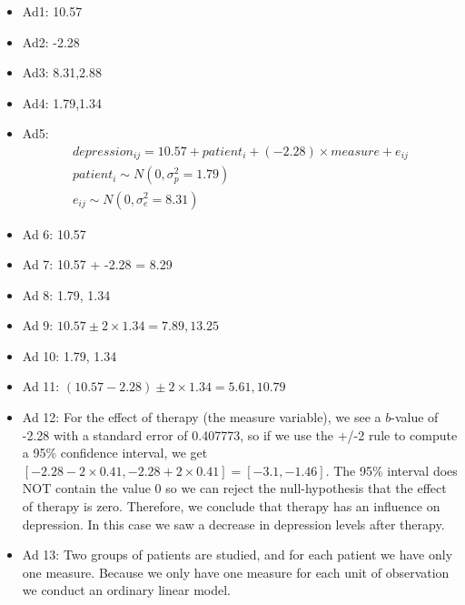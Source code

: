 \documentclass[]{report}\usepackage[]{graphicx}\usepackage[]{color}
\begin{document}
\begin{itemize}

\item Ad1: 10.57 \\
\item Ad2: -2.28 \\
\item Ad3: 8.31,2.88 \\
\item Ad4: 1.79,1.34 \\

\item Ad5:
\begin{eqnarray}
depression_{ij} = 10.57 + patient_i + (-2.28) \times measure + e_{ij} \\
patient_i \sim N(0, \sigma_p^2 = 1.79)\\
e_{ij} \sim N(0, \sigma_e^2 = 8.31)
\end{eqnarray}




\item Ad 6: 10.57\\
\item Ad 7: 10.57 + -2.28  = 8.29\\
\item Ad 8: 1.79, 1.34 \\

\item Ad 9: $10.57 \pm 2 \times 1.34 = {7.89, 13.25}$\\

\item Ad 10: 1.79, 1.34 \\

\item Ad 11: $(10.57 -2.28)  \pm  2 \times 1.34 = {5.61, 10.79 }   $\\

\item Ad 12: For the effect of therapy (the measure variable), we see a $b$-value of -2.28 with a standard error of 0.407773, so if we use the +/-2 rule to compute a 95\% confidence interval, we get $[ -2.28 - 2\times 0.41 , -2.28 + 2\times 0.41]  = [ -3.1 ,  -1.46]$. The 95\% interval does NOT contain the value 0 so we can reject the null-hypothesis that the effect of therapy is zero. Therefore, we conclude that therapy has an influence on depression. In this case we saw a decrease in depression levels after therapy.

\item Ad 13: Two groups of patients are studied, and for each patient we have only one measure. Because we only have one measure for each unit of observation we conduct an ordinary linear model.


\end{itemize}
\end{document}
